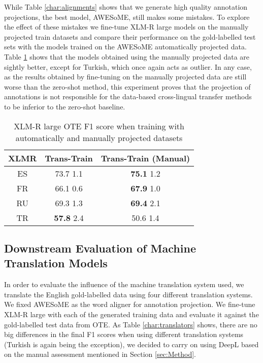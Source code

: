 \documentclass[11pt]{article}
\begin{document}
While Table \ref{char:alignments} shows that we generate high quality annotation projections, the best model, AWESoME, still makes some mistakes. To explore the effect of these mistakes we fine-tune XLM-R large models on the manually projected train datasets and compare their performance on the gold-labelled test sets with the models trained on the AWESoME automatically projected data.
Table \ref{char:ManualvsAutomaticProjection} shows that the models obtained using the manually projected data are sightly better, except for Turkish, which once again acts as outlier. In any case, as the results obtained by fine-tuning on the manually projected data are still worse than the zero-shot method, this experiment proves that the projection of annotations is not responsible for the data-based cross-lingual transfer methods to be inferior to the zero-shot baseline.

\begin{table}[htbp]
  \centering
  \small
\begin{tabular}{c|cc}
XLMR & Trans-Train & Trans-Train (Manual) \\
\hline
ES & 73.7  1.1 & \textbf{75.1}  1.2 \\
FR & 66.1  0.6 & \textbf{67.9}  1.0 \\
RU & 69.3  1.3 & \textbf{69.4}  2.1 \\
TR & \textbf{57.8}  2.4 & 50.6  1.4 \\
\end{tabular}
  \caption{XLM-R large OTE F1 score when training with automatically and manually projected datasets}
  \label{char:ManualvsAutomaticProjection}
\end{table}

\subsection{Downstream Evaluation of Machine Translation Models}

In order to evaluate the influence of the machine translation system used, we translate the English gold-labelled data using four different translation systems. We fixed AWESoME as the word aligner for annotation projection. We fine-tune XLM-R large with each of the generated training data and evaluate it against the gold-labelled test data from OTE. As Table \ref{char:translators} shows, there are no big differences in the final F1 scores when using different translation systems (Turkish is again being the exception), we decided to carry on using DeepL based on the manual assessment mentioned in Section \ref{sec:Method}.  
\end{document}
